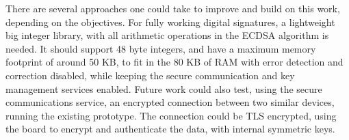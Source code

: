 There are several approaches one could take to improve and build on this work, depending on the objectives. For fully working digital signatures, a lightweight big integer library, with all arithmetic operations in the ECDSA algorithm is needed. It should support 48 byte integers, and have a maximum memory footprint of around 50 KB, to fit in the 80 KB of RAM with error detection and correction disabled, while keeping the secure communication and key management services enabled.
Future work could also test, using the secure communications service, an encrypted connection between two similar devices, running the existing prototype. The connection could be TLS encrypted, using the board to encrypt and authenticate the data, with internal symmetric keys. %
